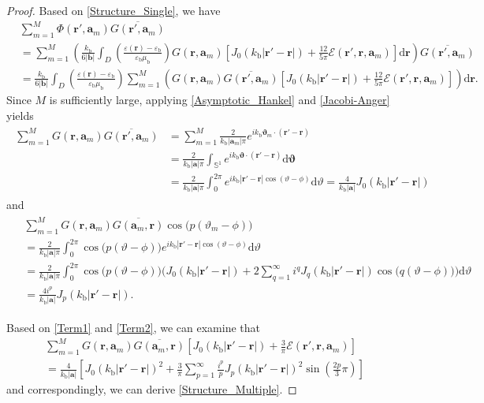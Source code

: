 \documentclass[10pt,a4paper]{amsart}
\newcommand{\eps}{\varepsilon}
\newcommand{\epsb}{\varepsilon_{\mathrm{b}}}
\newcommand{\kb}{k_{\mathrm{b}}}
\newcommand{\ma}{\mathbf{a}}
\newcommand{\mb}{\mathbf{b}}
\newcommand{\mr}{\mathbf{r}}
\newcommand{\mub}{\mu_{\mathrm{b}}}
\newcommand{\rd}{\mathrm{d}}
\newcommand{\vv}{\boldsymbol{\vartheta}}
\begin{document}
\begin{proof}
Based on \eqref{Structure_Single}, we have
\begin{align*}
&\sum_{m=1}^{M}\Phi(\mr',\ma_m)\overline{G(\mr',\ma_m)}\\
&=\sum_{m=1}^{M}\left(\frac{\kb}{6|\mb|}\int_D\left(\frac{\eps(\mr)-\epsb}{\epsb\mub}\right)G(\mr,\ma_m)\left[J_0(\kb|\mr'-\mr|)+\frac{12}{5\pi}\mathcal{E}(\mr',\mr,\ma_m)\right]\rd\mr\right)\overline{G(\mr',\ma_m)}\\
&=\frac{\kb}{6|\mb|}\int_D\left(\frac{\eps(\mr)-\epsb}{\epsb\mub}\right)\sum_{m=1}^{M}\left(G(\mr,\ma_m)\overline{G(\mr',\ma_m)}\left[J_0(\kb|\mr'-\mr|)+\frac{12}{5\pi}\mathcal{E}(\mr',\mr,\ma_m)\right]\right)\rd\mr.
\end{align*}
Since $M$ is sufficiently large, applying \eqref{Asymptotic_Hankel} and \eqref{Jacobi-Anger} yields
\begin{align}
\begin{aligned}\label{Term1}
\sum_{m=1}^{M}G(\mr,\ma_m)\overline{G(\mr',\ma_m)}&=\sum_{m=1}^{M}\frac{2}{\kb|\ma_m|\pi}e^{i\kb\vv_m\cdot(\mr'-\mr)}\\
&=\frac{2}{\kb|\ma|\pi}\int_{\mathbb{S}^1}e^{i\kb\vv\cdot(\mr'-\mr)}\rd\vv\\
&=\frac{2}{\kb|\ma|\pi}\int_0^{2\pi}e^{i\kb|\mr'-\mr|\cos(\vartheta-\phi)}\rd\vartheta=\frac{4}{\kb|\ma|}J_0(\kb|\mr'-\mr|)
\end{aligned}
\end{align}
and
\begin{align}
\begin{aligned}\label{Term2}
&\sum_{m=1}^{M}G(\mr,\ma_m)\overline{G(\ma_m,\mr)}\cos\big(p(\vartheta_m-\phi)\big)\\
&=\frac{2}{\kb|\ma|\pi}\int_0^{2\pi}\cos\big(p(\vartheta-\phi)\big)e^{i\kb|\mr'-\mr|\cos(\vartheta-\phi)}\rd\vartheta\\
&=\frac{2}{\kb|\ma|\pi}\int_0^{2\pi}\cos\big(p(\vartheta-\phi)\big)\bigg(J_0(\kb|\mr'-\mr|)+2\sum_{q=1}^{\infty}i^qJ_q(\kb|\mr'-\mr|)\cos\big(q(\vartheta-\phi)\big)\bigg)\rd\vartheta\\
&=\frac{4i^p}{\kb|\ma|} J_p(\kb|\mr'-\mr|).
\end{aligned}
\end{align}

Based on \eqref{Term1} and \eqref{Term2}, we can examine that
\begin{multline*}
\sum_{m=1}^{M}G(\mr,\ma_m)\overline{G(\ma_m,\mr)}\left[J_0(\kb|\mr'-\mr|)+\frac{3}{\pi}\mathcal{E}(\mr',\mr,\ma_m)\right]\\=\frac{4}{\kb|\ma|}\left[J_0(\kb|\mr'-\mr|)^2+\frac{3}{\pi}\sum_{p=1}^{\infty}\frac{i^p}{p}J_p(\kb|\mr'-\mr|)^2\sin\left(\frac{2p}{3}\pi\right)\right]
\end{multline*}
and correspondingly, we can derive \eqref{Structure_Multiple}.
\end{proof}
\end{document}
